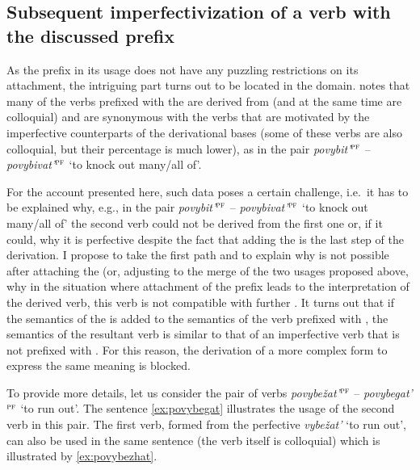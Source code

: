 \subsection{Subsequent imperfectivization of a verb with the discussed prefix}
As the prefix  in its  usage does not have any puzzling restrictions on its attachment, the intriguing part turns out to be located in the  domain. \citet[365]{Shvedova:82} notes that many of the verbs prefixed with the   are derived from  (and at the same time are colloquial) and are synonymous with the verbs that are motivated by the imperfective counterparts of the derivational bases (some of these verbs are also colloquial, but their percentage is much lower), as in the pair \textit{povybit'}$^{\textsc{pf}}$ -- \textit{povybivat'}$^{\textsc{pf}}$ `to knock out many/all of'.

For the account presented here, such data poses a certain challenge, i.e.\ it has to be explained why, e.g., in the pair \textit{povybit'}$^{\textsc{pf}}$ -- \textit{povybivat'}$^{\textsc{pf}}$ `to knock out many/all of' the second verb could not be derived from the first one or, if it could, why it is perfective despite the fact that adding the  is the last step of the derivation. I propose to take the first path and to explain why  is not possible after attaching the   (or, adjusting to the merge of the two usages proposed above, why in the situation where attachment of the prefix  leads to the  interpretation of the derived verb, this verb is not compatible with further . It turns out that if the semantics of the  is added to the semantics of the verb prefixed with  , the semantics of the resultant verb is similar to that of an imperfective verb that is not prefixed with . For this reason, the derivation of a more complex form to express the same meaning is blocked.

To provide more details, let us consider the pair of verbs \textit{povybe\v{z}at'}$^{\textsc{pf}}$ -- \textit{po\-vy\-be\-gat'}$^{\textsc{pf}}$ `to run out'. The sentence \ref{ex:povybegat} illustrates the usage of the second verb in this pair. The first verb, formed from the perfective  \textit{vybe\v{z}at'} `to run out', can also be used in the same sentence (the verb itself is colloquial) which is illustrated by \ref{ex:povybezhat}.

